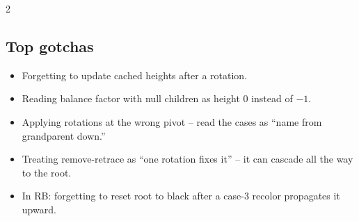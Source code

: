 \documentclass[10pt]{article}
\begin{document}
\begin{multicols}{2}
\subsection*{Top gotchas}
\begin{itemize}
    \item Forgetting to update cached heights after a rotation.
    \item Reading balance factor with null children as height $0$
    instead of $-1$.
    \item Applying rotations at the wrong pivot -- read the cases
    as ``name from grandparent down.''
    \item Treating remove-retrace as ``one rotation fixes it'' --
    it can cascade all the way to the root.
    \item In RB: forgetting to reset root to black after a case-3
    recolor propagates it upward.
\end{itemize}

\end{multicols}
\end{document}
